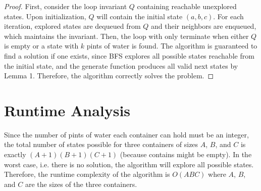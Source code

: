 \documentclass{article}
\begin{document}
\begin{proof}
First, consider the loop invariant $Q$ containing reachable unexplored states.
Upon initialization, $Q$ will contain the initial state $(a, b, c)$.
For each iteration, explored states are dequeued from $Q$ and their neighbors are enqueued, which maintains the invariant.
Then, the loop with only terminate when either $Q$ is empty or a state with $k$ pints of water is found.
The algorithm is guaranteed to find a solution if one exists, since BFS explores all possible states reachable from the initial state, and the generate function produces all valid next states by Lemma 1.
Therefore, the algorithm correctly solves the problem.
\end{proof}

\section{Runtime Analysis}

Since the number of pints of water each container can hold must be an integer, the total number of states possible for three containers of sizes $A$, $B$, and $C$ is exactly $(A + 1)(B + 1)(C + 1)$ (because contains might be empty).
In the worst case, i.e. there is no solution, the algorithm will explore all possible states.
Therefore, the runtime complexity of the algorithm is $O(ABC)$ where $A$, $B$, and $C$ are the sizes of the three containers.
\end{document}
